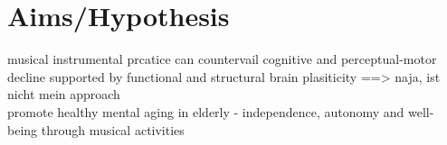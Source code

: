 
 
 


\section{Aims/Hypothesis}
musical instrumental prcatice can countervail cognitive and perceptual-motor decline supported by functional and structural brain plasiticity ==> naja, ist nicht mein approach
\\promote healthy mental aging in elderly - independence, autonomy and well-being through musical activities